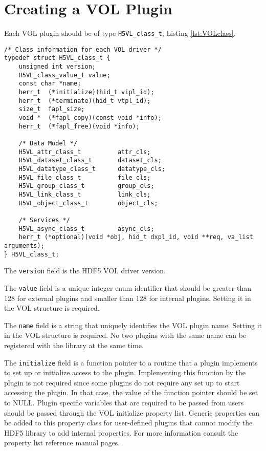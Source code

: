 \section{Creating a VOL Plugin}
\label{sec:vol}
Each VOL plugin should be of type \texttt{H5VL\_class\_t}, Listing \ref{lst:VOLclass}.

\hfill

\begin{lstlisting}[caption={VOL plugin class, H5VLpublic.h},captionpos=b, label={lst:VOLclass}]
/* Class information for each VOL driver */
typedef struct H5VL_class_t {
    unsigned int version;
    H5VL_class_value_t value;
    const char *name;
    herr_t  (*initialize)(hid_t vipl_id);
    herr_t  (*terminate)(hid_t vtpl_id);
    size_t  fapl_size;
    void *  (*fapl_copy)(const void *info);
    herr_t  (*fapl_free)(void *info);

    /* Data Model */
    H5VL_attr_class_t          attr_cls;
    H5VL_dataset_class_t       dataset_cls;
    H5VL_datatype_class_t      datatype_cls;
    H5VL_file_class_t          file_cls;
    H5VL_group_class_t         group_cls;
    H5VL_link_class_t          link_cls;
    H5VL_object_class_t        object_cls;

    /* Services */
    H5VL_async_class_t         async_cls;
    herr_t (*optional)(void *obj, hid_t dxpl_id, void **req, va_list arguments);
} H5VL_class_t;
\end{lstlisting}

The \texttt{version} field is the HDF5 VOL driver version. 

The \texttt{value} field is a unique integer enum identifier that should be
greater than 128 for external plugins and smaller than 128 for
internal plugins. Setting it in the VOL structure is required.

The \texttt{name} field is a string that uniquely identifies the VOL plugin
name. Setting it in the VOL structure is required. No two plugins with the same name can be registered with the library at the same time.

The \texttt{initialize} field is a function pointer to a routine that a plugin implements to set up or initialize access to the plugin. Implementing this function by the plugin is not required since some plugins do not require any set up to start accessing the plugin. In that case, the value of the function pointer should be set to NULL. Plugin specific variables that are required to be passed from users should be passed through the VOL initialize property list. Generic properties can be added to this property class for user-defined plugins that cannot modify the HDF5 library to add internal properties. For more information consult the property list reference manual pages.


